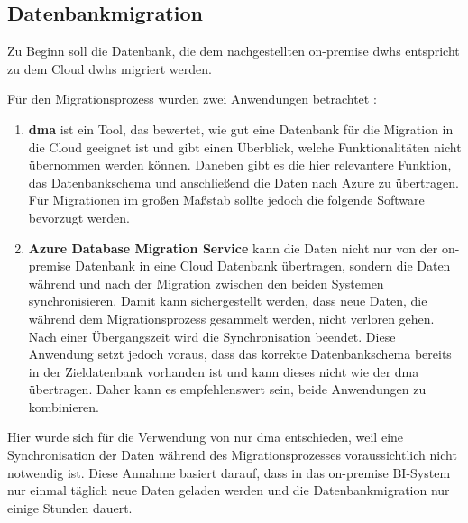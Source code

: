 \subsection{Datenbankmigration} \label{subsec:praktischeUmsetzung:Datenmigration}
Zu Beginn soll die Datenbank, die dem nachgestellten on-premise \acp{dwh} entspricht zu dem Cloud \acp{dwh} migriert werden. 

Für den Migrationsprozess wurden zwei Anwendungen betrachtet \cite{soh_microsoft_2020}: 
\begin{enumerate}
\item \textbf{\ac{dma}} ist ein Tool, das bewertet, wie gut eine Datenbank für die Migration in die Cloud geeignet ist und gibt einen Überblick, welche Funktionalitäten nicht übernommen werden können. Daneben gibt es die hier relevantere Funktion, das Datenbankschema und anschließend die Daten nach Azure zu übertragen. Für Migrationen im großen Maßstab sollte jedoch die folgende Software bevorzugt werden. 
\item \textbf{Azure Database Migration Service} kann die Daten nicht nur von der on-premise Datenbank in eine Cloud Datenbank übertragen, sondern die Daten während und nach der Migration zwischen den beiden Systemen synchronisieren. Damit kann sichergestellt werden, dass neue Daten, die während dem Migrationsprozess gesammelt werden, nicht verloren gehen. Nach einer Übergangszeit wird die Synchronisation beendet. Diese Anwendung setzt jedoch voraus, dass das korrekte Datenbankschema bereits in der Zieldatenbank vorhanden ist und kann dieses nicht wie der \ac{dma} übertragen. Daher kann es empfehlenswert sein, beide Anwendungen zu kombinieren.
\end{enumerate}
Hier wurde sich für die Verwendung von nur \ac{dma} entschieden, weil eine Synchronisation der Daten während des Migrationsprozesses voraussichtlich nicht notwendig ist. Diese Annahme basiert darauf, dass in das on-premise BI-System nur einmal täglich neue Daten geladen werden und die Datenbankmigration nur einige Stunden dauert.

